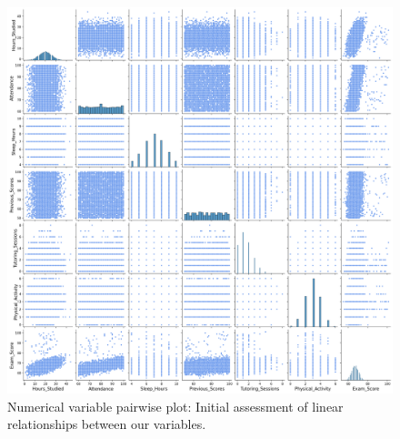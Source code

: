 \documentclass[twocolumn]{article} %
\begin{document}
\begin{figure}[h]
  \centering
  \includegraphics[width=0.9\columnwidth]{3-pairwise-plot.png}
  \caption{Numerical variable pairwise plot: Initial assessment of linear relationships between our variables.}
  \label{3:pairwise}
\end{figure}
\end{document}
